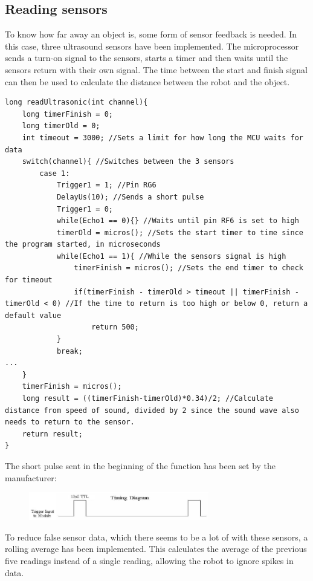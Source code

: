 \subsection{Reading sensors}
To know how far away an object is, some form of sensor feedback is needed. In this case, three ultrasound sensors have been implemented. The microprocessor sends a turn-on signal to the sensors, starts a timer and then waits until the sensors return with their own signal. The time between the start and finish signal can then be used to calculate the distance between the robot and the object.\\
\begin{lstlisting}
long readUltrasonic(int channel){  
    long timerFinish = 0;
    long timerOld = 0;
    int timeout = 3000; //Sets a limit for how long the MCU waits for data
    switch(channel){ //Switches between the 3 sensors
        case 1:
            Trigger1 = 1; //Pin RG6
            DelayUs(10); //Sends a short pulse
            Trigger1 = 0;
            while(Echo1 == 0){} //Waits until pin RF6 is set to high
            timerOld = micros(); //Sets the start timer to time since the program started, in microseconds
            while(Echo1 == 1){ //While the sensors signal is high
                timerFinish = micros(); //Sets the end timer to check for timeout
                if(timerFinish - timerOld > timeout || timerFinish - timerOld < 0) //If the time to return is too high or below 0, return a default value
                    return 500;
            }
            break;
...
    }
    timerFinish = micros();
    long result = ((timerFinish-timerOld)*0.34)/2; //Calculate distance from speed of sound, divided by 2 since the sound wave also needs to return to the sensor.
    return result;  
}
\end{lstlisting}
\newpage
The short pulse sent in the beginning of the function has been set by the manufacturer: \cite{HCSR04Datasheet}
\begin{figure}[!ht]
	\centering
	\includegraphics[width=0.7\textwidth]{figures/sensorTiming.PNG}
	\caption{}
	\label{Timing diagram}
\end{figure}

To reduce false sensor data, which there seems to be a lot of with these sensors, a rolling average has been implemented. This calculates the average of the previous five readings instead of a single reading, allowing the robot to ignore spikes in data.
\newpage
